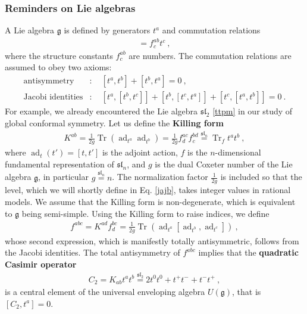 \documentclass[12pt, a4paper, notitlepage, twoside]{report}
\numberwithin{equation}{section}
\theoremstyle{break}
\begin{document}
\subsubsection{Reminders on Lie algebras}

A Lie algebra $\mathfrak{g}$ is defined by generators $t^a$ and commutation relations 
\begin{align}
 [t^a,t^b] = f^{ab}_c t^c \ ,
\label{ttft}
\end{align}
where the structure constants $f^{ab}_c$ are numbers.
The commutation relations are assumed to obey two axioms:
\begin{align}
 \text{antisymmetry} & : \quad [t^a,t^b] + [t^b,t^a] = 0\ ,
\\
\text{Jacobi identities} & : \quad  [t^a,[t^b,t^c]] + [t^b,[t^c,t^a]] + [t^c,[t^a,t^b]] = 0 \ .
\end{align}
For example, we already encountered the Lie algebra $\mathfrak{sl}_2$ \eqref{ttpm} in our study of global conformal symmetry.
Let us define the \textbf{\boldmath Killing form} 
\begin{align}
 K^{ab} = \frac{1}{2g} \operatorname{Tr} \left(\operatorname{ad}_{t^a}\operatorname{ad}_{t^b}\right) =\frac{1}{2g} f^{ac}_d f^{bd}_c \overset{\mathfrak{sl}_n}{=}\operatorname{Tr}_f t^at^b\ ,
\end{align}
where  $\operatorname{ad}_t(t') = [t,t']$ is the adjoint action, $f$ is the $n$-dimensional fundamental representation of $\mathfrak{sl}_n$, and $g$ is the dual Coxeter number of the Lie algebra $\mathfrak{g}$, in particular $g\overset{\mathfrak{sl}_n}{=}n$.
The normalization factor $\frac{1}{2g}$ is included so that the level, which we will shortly define in Eq. \eqref{jajb}, takes integer values in rational models.
We assume that the Killing form is non-degenerate, which is equivalent to $\mathfrak{g}$ being semi-simple. 
Using the Killing form to raise indices, we define
\begin{align}
 f^{abc} = K^{ad}f_d^{bc} = \frac{1}{2g}\operatorname{Tr}\left( \operatorname{ad}_{t^a} [\operatorname{ad}_{t^b}, \operatorname{ad}_{t^c}] \right)\ ,
\end{align}
whose second expression, which is manifestly totally antisymmetric, follows from the Jacobi identities.
The total antisymmetry of $f^{abc}$ implies that the \textbf{\boldmath quadratic Casimir operator}
\begin{align}
 C_2 = K_{ab} t^a t^b \overset{\mathfrak{sl}_2}{=} 2t^0t^0+ t^+t^-+t^-t^+\ ,
\label{ctk}
\end{align}
is a central element of the universal enveloping algebra $U(\mathfrak{g})$, that is $[C_2,t^a]=0$.
\end{document}
